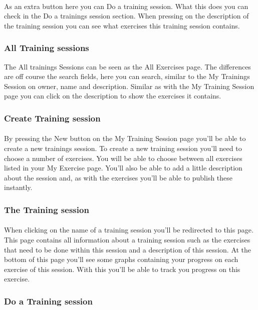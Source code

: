 \documentclass[11pt,a4paper]{scrartcl}
\begin{document}
\paragraph{}As an extra button here you can Do a training session. What this does you can check in the Do a trainings session section. When pressing on the description of the training session you can see what exercises this training session contains.
\subsubsection{All Training sessions}
The All trainings Sessions can be seen as the All Exercises page. The differences are off course the search fields, here you can search, similar to the My Trainings Session on owner, name and description. Similar as with the My Training Session page you can click on the description to show the exercises it contains.

\subsubsection{Create Training session}
\paragraph{}By pressing the New button on the My Training Session page you'll be able to create a new trainings session. To create a new training session you'll need to choose a number of exercises. You will be able to choose between all exercises listed in your My Exercise page. You'll also be able to add a little description about the session and, as with the exercises you'll be able to publish these instantly.
\subsubsection{The Training session}
\paragraph{}When clicking on the name of a training session you'll be redirected to this page. This page contains all information about a training session such as the exercises that need to be done within this session and a description of this session. At the bottom of this page you'll see some graphs containing your progress on each exercise of this session. With this you'll be able to track you progress on this exercise.
\subsubsection{Do a Training session} 
\end{document}
